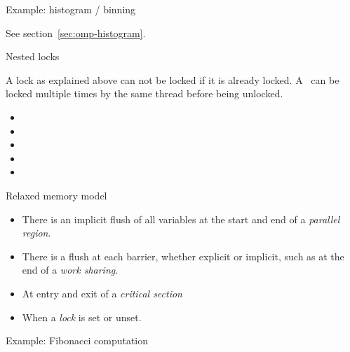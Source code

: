  {Example: histogram / binning}

See section~\ref{sec:omp-histogram}.

 {Nested locks}

A lock as explained above can not be locked if it is already locked.
A~ can be locked multiple times by the same
thread before being unlocked.

\begin{itemize}
\item {}
\item {}
\item {}
\item {}
\item {}
\end{itemize}


 {Relaxed memory model}
\label{sec:omp:flush}


\begin{itemize}
\item There is an implicit flush of all variables at the start and end 
  of a \emph{parallel region}.
\item There is a flush at each barrier, whether explicit or implicit,
  such as at the end of a
  \emph{work sharing}.
\item At entry and exit of a
  \emph{critical section}
\item When a \emph{lock} is set or unset.
\end{itemize}

 {Example: Fibonacci computation}

